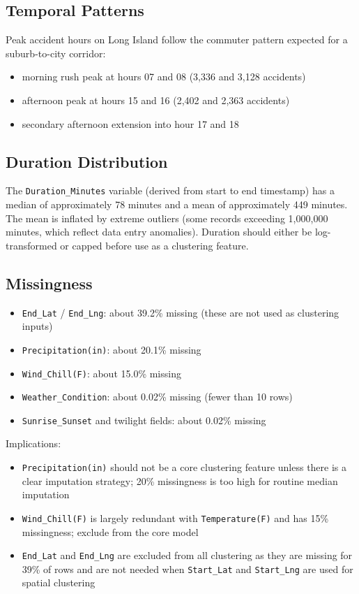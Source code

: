 \documentclass[11pt]{article}
\begin{document}
\subsection{Temporal Patterns}

Peak accident hours on Long Island follow the commuter pattern expected for a suburb-to-city corridor:

\begin{itemize}
\item morning rush peak at hours 07 and 08 (3,336 and 3,128 accidents)
\item afternoon peak at hours 15 and 16 (2,402 and 2,363 accidents)
\item secondary afternoon extension into hour 17 and 18
\end{itemize}

\subsection{Duration Distribution}

The \texttt{Duration\_Minutes} variable (derived from start to end timestamp) has a median of approximately 78 minutes and a mean of approximately 449 minutes. The mean is inflated by extreme outliers (some records exceeding 1,000,000 minutes, which reflect data entry anomalies). Duration should either be log-transformed or capped before use as a clustering feature.

\subsection{Missingness}

\begin{itemize}
\item \texttt{End\_Lat} / \texttt{End\_Lng}: about 39.2\% missing (these are not used as clustering inputs)
\item \texttt{Precipitation(in)}: about 20.1\% missing
\item \texttt{Wind\_Chill(F)}: about 15.0\% missing
\item \texttt{Weather\_Condition}: about 0.02\% missing (fewer than 10 rows)
\item \texttt{Sunrise\_Sunset} and twilight fields: about 0.02\% missing
\end{itemize}

Implications:

\begin{itemize}
\item \texttt{Precipitation(in)} should not be a core clustering feature unless there is a clear imputation strategy; 20\% missingness is too high for routine median imputation
\item \texttt{Wind\_Chill(F)} is largely redundant with \texttt{Temperature(F)} and has 15\% missingness; exclude from the core model
\item \texttt{End\_Lat} and \texttt{End\_Lng} are excluded from all clustering as they are missing for 39\% of rows and are not needed when \texttt{Start\_Lat} and \texttt{Start\_Lng} are used for spatial clustering
\end{itemize}
\end{document}
